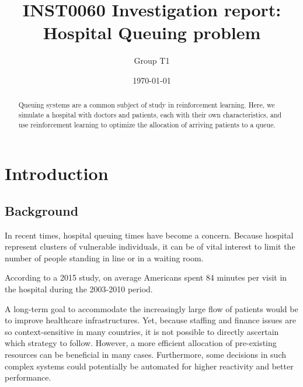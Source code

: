\documentclass[11point]{article}
\begin{document}
\title{INST0060 Investigation report:\\Hospital Queuing problem}
\author[*]{Group T1}
\date{\today}

\twocolumn[
\maketitle
]

\begin{abstract}
Queuing systems are a common subject of study in reinforcement learning. Here, we simulate a hospital with doctors and patients, each with their own characteristics, and use reinforcement learning to optimize the allocation of arriving patients to a queue.
\end{abstract}

\section{Introduction}
\label{sec:intro}

\subsection{Background}
In recent times, hospital queuing times have become a concern.
Because hospital represent clusters of vulnerable individuals, it can be of vital interest to limit the number of people standing in line or in a waiting room.

According to a 2015 study, on average Americans spent 84 minutes per visit in the hospital during the 2003-2010 period. \cite{Ray2015}

A long-term goal to accommodate the increasingly large flow of patients would be to improve healthcare infrastructures.
Yet, because staffing and finance issues are so context-sensitive in many countries, it is not possible to directly ascertain which strategy to follow.
However, a more efficient allocation of pre-existing resources can be beneficial in many cases.
Furthermore, some decisions in such complex systems could potentially be automated for higher reactivity and better performance.
\end{document}
